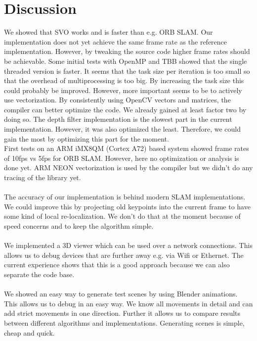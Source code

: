 \documentclass[11pt,a4paper,titlepage,oneside]{report}
\begin{document}
\chapter{Discussion}\label{ch:discussion}

We showed that SVO works and is faster than e.g. ORB SLAM. Our implementation does not yet achieve the same frame rate as the reference implementation. However, by tweaking the source code higher frame rates should be achievable. Some initial tests with OpenMP and TBB showed that the single threaded version is faster. It seems that the task size per iteration is too small so that the overhead of multiprocessing is too big. By increasing the task size this could probably be improved. However, more important seems to be to actively use vectorization. By consistently using OpenCV vectors and matrices, the compiler can better optimize the code. We already gained at least factor two by doing so. The depth filter implementation is the slowest part in the current implementation. However, it was also optimized the least. Therefore, we could gain the most by optimizing this part for the moment.\\
First tests on an ARM iMX8QM (Cortex A72) based system showed frame rates of 10fps vs 5fps for ORB SLAM. However, here no optimization or analysis is done yet. ARM NEON vectorization is used by the compiler but we didn't do any tracing of the library yet.\\\\
The accuracy of our implementation is behind modern SLAM implementations. We could improve this by projecting old keypoints into the current frame to have some kind of local re-localization. We don't do that at the moment because of speed concerns and to keep the algorithm simple.\\\\
We implemented a 3D viewer which can be used over a network connections. This allows us to debug devices that are further away e.g. via Wifi or Ethernet. The current experience shows that this is a good approach because we can also separate the code base.\\\\
We showed an easy way to generate test scenes by using Blender animations. This allows us to debug in an easy way. We know all movements in detail and can add strict movements in one direction. Further it allows us to compare results between different algorithms and implementations. Generating scenes is simple, cheap and quick.\\\\
\end{document}

